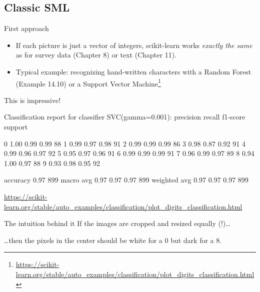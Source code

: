   

\subsection{Classic SML}

\begin{frame}{First approach}
  \begin{itemize}
  \item If each picture is just a vector of integers, scikit-learn works \emph{exactly the same} as for survey data (Chapter 8) or text (Chapter 11).
  \item Typical example: recognizing hand-written characters with a Random Forest (Example 14.10) or a Support Vector Machine\footnote{\url{https://scikit-learn.org/stable/auto\_examples/classification/plot\_digits\_classification.html}}
  \end{itemize}
\end{frame}


\begin{frame}[fragile]{This is impressive!}
\begin{lstlistingoutputtiny}
Classification report for classifier SVC(gamma=0.001):
              precision    recall  f1-score   support

           0       1.00      0.99      0.99        88
           1       0.99      0.97      0.98        91
           2       0.99      0.99      0.99        86
           3       0.98      0.87      0.92        91
           4       0.99      0.96      0.97        92
           5       0.95      0.97      0.96        91
           6       0.99      0.99      0.99        91
           7       0.96      0.99      0.97        89
           8       0.94      1.00      0.97        88
           9       0.93      0.98      0.95        92

    accuracy                           0.97       899
   macro avg       0.97      0.97      0.97       899
weighted avg       0.97      0.97      0.97       899
\end{lstlistingoutputtiny}
\tiny{\url{https://scikit-learn.org/stable/auto\_examples/classification/plot\_digits\_classification.html}}

\end{frame}




\begin{frame}{The intuition behind it}
  If the images are cropped and resized equally (!)\ldots

  \vspace{1cm}
  
  \ldots then the pixels in the center should be white for a 0 but dark for a 8.
\end{frame}


